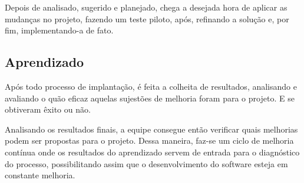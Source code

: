 Depois de analisado, sugerido e planejado, chega a desejada hora de aplicar as
mudanças no projeto, fazendo um teste piloto, após, refinando a solução e, por
fim, implementando-a de fato.

\subsection{Aprendizado}
\label{sub:Aprendizado}

Após todo processo de implantação, é feita a colheita de resultados, analisando
e avaliando o quão eficaz aquelas sujestões de melhoria foram para o projeto. E
se obtiveram êxito ou não.

Analisando os resultados finais, a equipe consegue então verificar quais melhorias
podem ser propostas para o projeto. Dessa maneira, faz-se um ciclo de melhoria
contínua onde os resultados do aprendizado servem de entrada para o diagnóstico
do processo, possibilitando assim que o desenvolvimento do software esteja em
constante melhoria.
